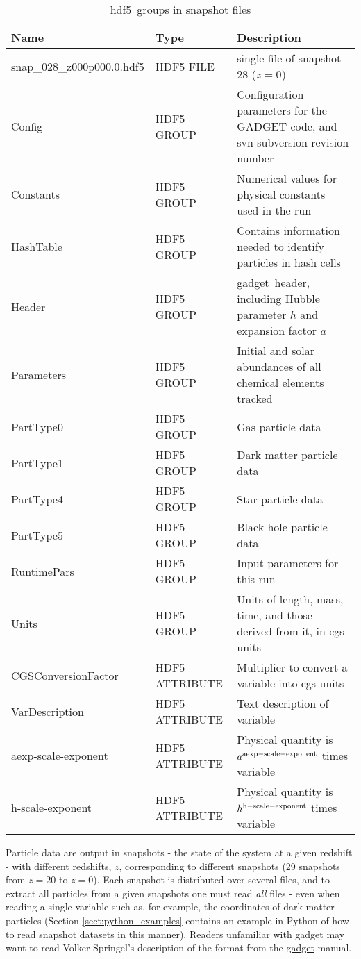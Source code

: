 \documentclass[10pt, a4paper]{article}
\newcommand{\hdf}{{\sc hdf5}}
\newcommand{\gadget}{{\sc gadget}}
\begin{document}
\begin{table}
\label{table:file_layout}
\caption{\hdf\ groups in snapshot files}
\begin{center}
\footnotesize
\renewcommand{\arraystretch}{1.5}
\begin{tabular}{>{\ttfamily}p{4cm}p{3cm}p{9.5cm}}
\hline
Name & Type & Description \\ \hline\hline
snap\_028\_z000p000.0.hdf5 & HDF5 FILE & single file of snapshot 28 ($z=0$) \\
\hline
Config & HDF5 GROUP & Configuration parameters for the GADGET code, and svn subversion revision number \\
Constants & HDF5 GROUP & Numerical values for physical constants used in the run \\
HashTable & HDF5 GROUP & Contains information needed to identify particles in hash cells \\
Header & HDF5 GROUP & \gadget\ header, including Hubble parameter $h$ and expansion factor $a$ \\
Parameters & HDF5 GROUP & Initial and solar abundances of all chemical elements tracked \\
PartType0 & HDF5 GROUP & Gas particle data \\
PartType1 & HDF5 GROUP & Dark matter particle data  \\
PartType4 & HDF5 GROUP & Star particle data \\
PartType5 & HDF5 GROUP & Black hole particle data \\
RuntimePars & HDF5 GROUP & Input parameters for this run \\
Units & HDF5 GROUP & Units of length, mass, time, and those derived from it, in cgs units \\
\hline
CGSConversionFactor & HDF5 ATTRIBUTE & Multiplier to convert a variable into cgs units \\
VarDescription & HDF5 ATTRIBUTE & Text description of variable \\
aexp-scale-exponent & HDF5 ATTRIBUTE & Physical quantity is $a^{\rm aexp-scale-exponent}$ times variable \\
h-scale-exponent & HDF5 ATTRIBUTE & Physical quantity is $h^{\rm h-scale-exponent}$ times variable \\
\hline

\end{tabular}
\end{center}
\label{table:groups}
\end{table}

Particle data are output in snapshots - the state of the system at a given
redshift - with different redshifts, $z$, corresponding to different snapshots
(29 snapshots from $z=20$ to $z=0$). Each snapshot is distributed over several
files, and to extract all particles from a given snapshots one must read {\em
all} files - even when reading a single variable such as, for example, the
coordinates of dark matter particles (Section \ref{sect:python_examples}
contains an example in {\sc Python} of how to read snapshot datasets in this
manner). Readers unfamiliar with {\sc gadget} may want to read Volker Springel's
description of the format from the
{\color{blue}\href{https://wwwmpa.mpa-garching.mpg.de/gadget/users-guide.pdf}{\sc
gadget} manual}.
\end{document}
